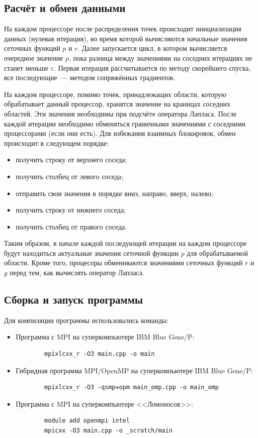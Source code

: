 \documentclass[11pt]{article}
\numberwithin{equation}{section}
\theoremstyle{plain}
\theoremstyle{definition}
\begin{document}
\subsection{Расчёт и обмен данными}

На каждом процессоре после распределения точек происходит инициализация
данных (нулевая итерация), во время которой вычисляются начальные значения
сеточных функций $p$ и $r$. Далее запускается цикл, в котором вычисляется
очередное значение $p$, пока разница между значениями на соседних итерациях
не станет меньше $\varepsilon$. Первая итерация рассчитывается по методу
скорейшего спуска, все последующие~--- методом сопряжённых градиентов.

На каждом процессоре, помимо точек, принадлежащих области, которую обрабатывает
данный процессор, хранятся значение на краницах соседних областей. Эти
значения необходимы при подсчёте оператора Лапласа.
После каждой итерации необходимо обменяться граничными значениями с соседними
процессорами (если они есть). Для избежания взаимных блокировок, обмен
происходит в следующем порядке:
\begin{itemize}
    \item получить строку от верхнего соседа;
    \item получить столбец от левого соседа;
    \item отправить свои значения в порядке вниз, направо, вверх, налево;
    \item получить строку от нижнего соседа;
    \item получить столбец от правого соседа.
\end{itemize}

Таким образом, в начале каждой последующей итерации на каждом процессоре будут
находиться актуальные значения сеточной функции $p$ для обрабатываемой области.
Кроме того, процесоры обмениваются значениями сеточных функций $r$ и $g$ перед
тем, как вычислять оператор Лапласа.

\subsection{Сборка и запуск программы}

Для компиляции программы использовались команды:
\begin{itemize}
    \item Программа с MPI на суперкомпьютере IBM Blue Gene/P:
        \begin{verbatim}
        mpixlcxx_r -O3 main.cpp -o main
        \end{verbatim}
    \item Гибридная программа MPI/OpenMP на суперкомпьютере IBM Blue Gene/P:
        \begin{verbatim}
        mpixlcxx_r -O3 -qsmp=opm main_omp.cpp -o main_omp
        \end{verbatim}
    \item Программа с MPI на суперкомпьютере <<Ломоносов>>:
        \begin{verbatim}
        module add openmpi intel
        mpicxx -O3 main.cpp -o _scratch/main
        \end{verbatim}
\end{itemize}
\end{document}
